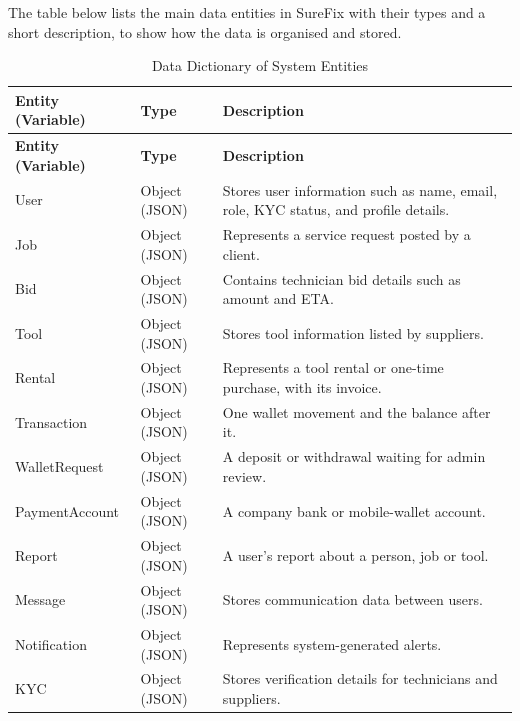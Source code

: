 \documentclass[A4paper,12pt]{report}
\theoremstyle{plain}
\theoremstyle{definition}
\theoremstyle{remark}
\numberwithin{equation}{section}
\begin{document}
The table below lists the main data entities in SureFix with their types and a short description, to show how the data is organised and stored.
\begin{longtable}{|p{}|p{}|p{}|}
\caption{Data Dictionary of System Entities} \\

\hline
\textbf{Entity (Variable)} & \textbf{Type} & \textbf{Description} \\ 
\hline
\endfirsthead

\hline
\textbf{Entity (Variable)} & \textbf{Type} & \textbf{Description} \\ 
\hline
\endhead

User & Object (JSON) & Stores user information such as name, email, role, KYC status, and profile details. \\ \hline

Job & Object (JSON) & Represents a service request posted by a client. \\ \hline

Bid & Object (JSON) & Contains technician bid details such as amount and ETA. \\ \hline

Tool & Object (JSON) & Stores tool information listed by suppliers. \\ \hline

Rental & Object (JSON) & Represents a tool rental or one-time purchase, with its invoice. \\ \hline

Transaction & Object (JSON) & One wallet movement and the balance after it. \\ \hline

WalletRequest & Object (JSON) & A deposit or withdrawal waiting for admin review. \\ \hline

PaymentAccount & Object (JSON) & A company bank or mobile-wallet account. \\ \hline

Report & Object (JSON) & A user's report about a person, job or tool. \\ \hline

Message & Object (JSON) & Stores communication data between users. \\ \hline

Notification & Object (JSON) & Represents system-generated alerts. \\ \hline

KYC & Object (JSON) & Stores verification details for technicians and suppliers. \\ \hline


\end{longtable}
\end{document}

